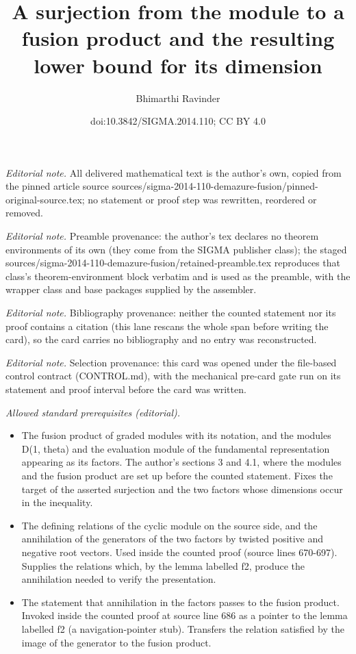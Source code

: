 \documentclass[10pt,a4paper]{amsart}
\title{A surjection from the module to a fusion product and the resulting lower bound for its dimension}
\author{Bhimarthi Ravinder}
\date{doi:10.3842/SIGMA.2014.110; CC BY 4.0}
\begin{document}
\maketitle
\noindent\textit{Editorial note.} All delivered mathematical text is the author's own, copied from the pinned article source sources/sigma-2014-110-demazure-fusion/pinned-original-source.tex; no statement or proof step was rewritten, reordered or removed.\par\medskip
\noindent\textit{Editorial note.} Preamble provenance: the author's tex declares no theorem environments of its own (they come from the SIGMA publisher class); the staged sources/sigma-2014-110-demazure-fusion/retained-preamble.tex reproduces that class's theorem-environment block verbatim and is used as the preamble, with the wrapper class and base packages supplied by the assembler.\par\medskip
\noindent\textit{Editorial note.} Bibliography provenance: neither the counted statement nor its proof contains a citation (this lane rescans the whole span before writing the card), so the card carries no bibliography and no entry was reconstructed.\par\medskip
\noindent\textit{Editorial note.} Selection provenance: this card was opened under the file-based control contract (CONTROL.md), with the mechanical pre-card gate run on its statement and proof interval before the card was written.\par\medskip
\noindent\textit{Allowed standard prerequisites (editorial).}\begin{itemize}
\item The fusion product of graded modules with its notation, and the modules D(1, theta) and the evaluation module of the fundamental representation appearing as its factors. The author's sections 3 and 4.1, where the modules and the fusion product are set up before the counted statement. Fixes the target of the asserted surjection and the two factors whose dimensions occur in the inequality.
\item The defining relations of the cyclic module on the source side, and the annihilation of the generators of the two factors by twisted positive and negative root vectors. Used inside the counted proof (source lines 670-697). Supplies the relations which, by the lemma labelled f2, produce the annihilation needed to verify the presentation.
\item The statement that annihilation in the factors passes to the fusion product. Invoked inside the counted proof at source line 686 as a pointer to the lemma labelled f2 (a navigation-pointer stub). Transfers the relation satisfied by the image of the generator to the fusion product.
\end{itemize}\medskip
\end{document}
